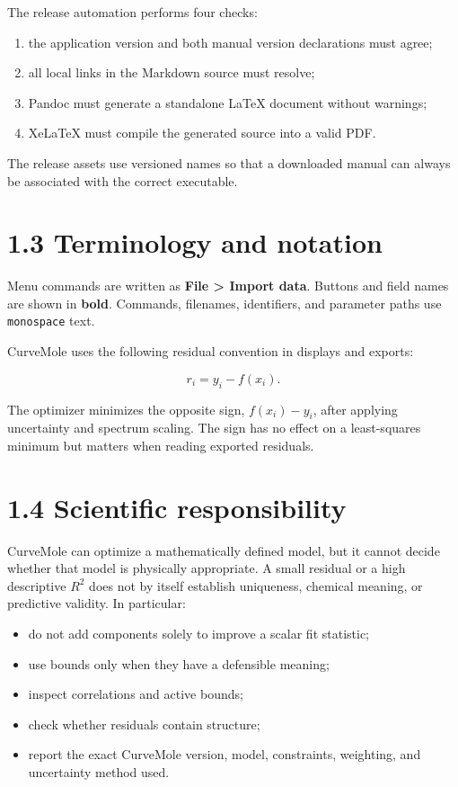 \documentclass[
  10pt,
  a4paper,
  oneside]{scrreprt}
\providecommand{\tightlist}{%
  \setlength{\itemsep}{0pt}\setlength{\parskip}{0pt}}
\begin{document}
The release automation performs four checks:

\begin{enumerate}
\def\labelenumi{\arabic{enumi}.}
\tightlist
\item
  the application version and both manual version declarations must
  agree;
\item
  all local links in the Markdown source must resolve;
\item
  Pandoc must generate a standalone LaTeX document without warnings;
\item
  XeLaTeX must compile the generated source into a valid PDF.
\end{enumerate}

The release assets use versioned names so that a downloaded manual can
always be associated with the correct executable.

\hypertarget{terminology-and-notation}{%
\section{1.3 Terminology and notation}\label{terminology-and-notation}}

Menu commands are written as \textbf{File \textgreater{} Import data}.
Buttons and field names are shown in \textbf{bold}. Commands, filenames,
identifiers, and parameter paths use \texttt{monospace} text.

CurveMole uses the following residual convention in displays and
exports:

\[
r_i = y_i - f(x_i).
\]

The optimizer minimizes the opposite sign, \(f(x_i)-y_i\), after
applying uncertainty and spectrum scaling. The sign has no effect on a
least-squares minimum but matters when reading exported residuals.

\hypertarget{scientific-responsibility}{%
\section{1.4 Scientific
responsibility}\label{scientific-responsibility}}

CurveMole can optimize a mathematically defined model, but it cannot
decide whether that model is physically appropriate. A small residual or
a high descriptive \(R^2\) does not by itself establish uniqueness,
chemical meaning, or predictive validity. In particular:

\begin{itemize}
\tightlist
\item
  do not add components solely to improve a scalar fit statistic;
\item
  use bounds only when they have a defensible meaning;
\item
  inspect correlations and active bounds;
\item
  check whether residuals contain structure;
\item
  report the exact CurveMole version, model, constraints, weighting, and
  uncertainty method used.
\end{itemize}
\end{document}
